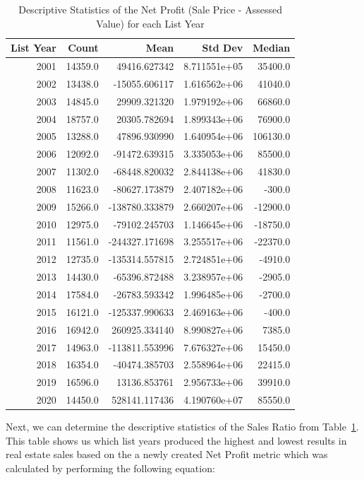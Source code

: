 \documentclass[12pt]{article}
\begin{document}
\begin{table}[!t]
\caption{Descriptive Statistics of the Net Profit (Sale Price - Assessed Value) for each List Year}
\label{tab:dsSR} 
\centering
\begin{tabular}{r|r|r|r|r}
\toprule
List Year & Count & Mean & Std Dev & Median \\
\midrule
2001 & 14359.0 &   49416.627342 & 8.711551e+05 &  35400.0 \\
2002 & 13438.0 &  -15055.606117 & 1.616562e+06 &  41040.0 \\
2003 & 14845.0 &   29909.321320 & 1.979192e+06 &  66860.0 \\
2004 & 18757.0 &   20305.782694 & 1.899343e+06 &  76900.0 \\
2005 & 13288.0 &   47896.930990 & 1.640954e+06 & 106130.0 \\
2006 & 12092.0 &  -91472.639315 & 3.335053e+06 &  85500.0 \\
2007 & 11302.0 &  -68448.820032 & 2.844138e+06 &  41830.0 \\
2008 & 11623.0 &  -80627.173879 & 2.407182e+06 &   -300.0 \\
2009 & 15266.0 & -138780.333879 & 2.660207e+06 & -12900.0 \\
2010 & 12975.0 &  -79102.245703 & 1.146645e+06 & -18750.0 \\
2011 & 11561.0 & -244327.171698 & 3.255517e+06 & -22370.0 \\
2012 & 12735.0 & -135314.557815 & 2.724851e+06 &  -4910.0 \\
2013 & 14430.0 &  -65396.872488 & 3.238957e+06 &  -2905.0 \\
2014 & 17584.0 &  -26783.593342 & 1.996485e+06 &  -2700.0 \\
2015 & 16121.0 & -125337.990633 & 2.469163e+06 &   -400.0 \\
2016 & 16942.0 &  260925.334140 & 8.990827e+06 &   7385.0 \\
2017 & 14963.0 & -113811.553996 & 7.676327e+06 &  15450.0 \\
2018 & 16354.0 &  -40474.385703 & 2.558964e+06 &  22415.0 \\
2019 & 16596.0 &   13136.853761 & 2.956733e+06 &  39910.0 \\
2020 & 14450.0 &  528141.117436 & 4.190760e+07 &  85550.0 \\
\bottomrule
\end{tabular}
\end{table}

Next, we can determine the descriptive statistics of the Sales Ratio from Table~\ref{tab:dsSR}. This table shows us which list years produced the highest and lowest results in real estate sales based on the a newly created Net Profit metric which was calculated by performing the following equation: 
\end{document}
